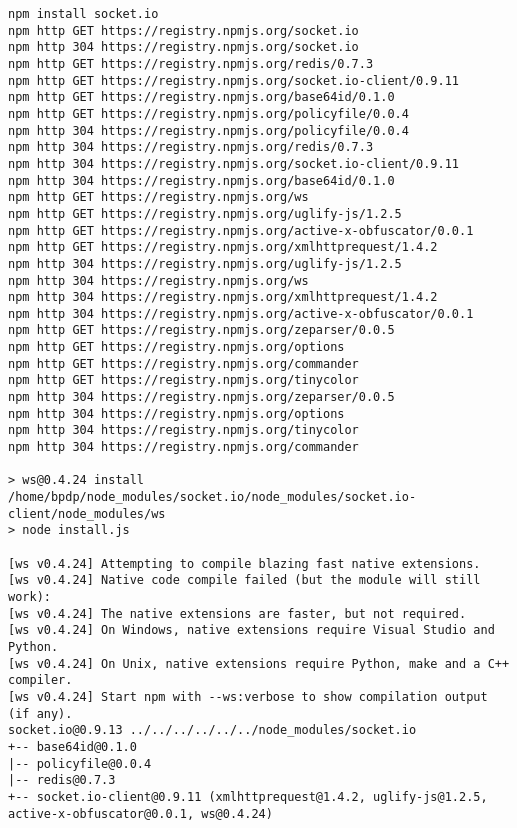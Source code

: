 \lstset{language=Bash,caption=Instalasi Socket.io}
\begin{lstlisting}
npm install socket.io
npm http GET https://registry.npmjs.org/socket.io
npm http 304 https://registry.npmjs.org/socket.io
npm http GET https://registry.npmjs.org/redis/0.7.3
npm http GET https://registry.npmjs.org/socket.io-client/0.9.11
npm http GET https://registry.npmjs.org/base64id/0.1.0
npm http GET https://registry.npmjs.org/policyfile/0.0.4
npm http 304 https://registry.npmjs.org/policyfile/0.0.4
npm http 304 https://registry.npmjs.org/redis/0.7.3
npm http 304 https://registry.npmjs.org/socket.io-client/0.9.11
npm http 304 https://registry.npmjs.org/base64id/0.1.0
npm http GET https://registry.npmjs.org/ws
npm http GET https://registry.npmjs.org/uglify-js/1.2.5
npm http GET https://registry.npmjs.org/active-x-obfuscator/0.0.1
npm http GET https://registry.npmjs.org/xmlhttprequest/1.4.2
npm http 304 https://registry.npmjs.org/uglify-js/1.2.5
npm http 304 https://registry.npmjs.org/ws
npm http 304 https://registry.npmjs.org/xmlhttprequest/1.4.2
npm http 304 https://registry.npmjs.org/active-x-obfuscator/0.0.1
npm http GET https://registry.npmjs.org/zeparser/0.0.5
npm http GET https://registry.npmjs.org/options
npm http GET https://registry.npmjs.org/commander
npm http GET https://registry.npmjs.org/tinycolor
npm http 304 https://registry.npmjs.org/zeparser/0.0.5
npm http 304 https://registry.npmjs.org/options
npm http 304 https://registry.npmjs.org/tinycolor
npm http 304 https://registry.npmjs.org/commander

> ws@0.4.24 install /home/bpdp/node_modules/socket.io/node_modules/socket.io-client/node_modules/ws
> node install.js

[ws v0.4.24] Attempting to compile blazing fast native extensions.
[ws v0.4.24] Native code compile failed (but the module will still work):
[ws v0.4.24] The native extensions are faster, but not required.
[ws v0.4.24] On Windows, native extensions require Visual Studio and Python.
[ws v0.4.24] On Unix, native extensions require Python, make and a C++ compiler.
[ws v0.4.24] Start npm with --ws:verbose to show compilation output (if any).
socket.io@0.9.13 ../../../../../../node_modules/socket.io
+-- base64id@0.1.0
|-- policyfile@0.0.4
|-- redis@0.7.3
+-- socket.io-client@0.9.11 (xmlhttprequest@1.4.2, uglify-js@1.2.5, active-x-obfuscator@0.0.1, ws@0.4.24)
\end{lstlisting}


